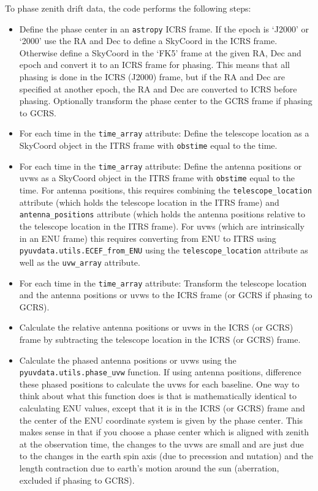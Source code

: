 \documentclass[11pt, oneside]{article}   	%
\begin{document}
To phase zenith drift data, the code performs the following steps:
\begin{itemize}
\item{Define the phase center in an \texttt{astropy} ICRS frame. If the epoch is `J2000' or `2000' use the RA and Dec to define a SkyCoord in the ICRS frame. Otherwise define a SkyCoord in the `FK5' frame at the given RA, Dec and epoch and convert it to an ICRS frame for phasing. This means that all phasing is done in the ICRS (J2000) frame, but if the RA and Dec are specified at another epoch, the RA and Dec are converted to ICRS before phasing. Optionally transform the phase center to the GCRS frame if phasing to GCRS.}
\item{For each time in the \verb!time_array! attribute: Define the telescope location as a SkyCoord object in the ITRS frame with \verb!obstime! equal to the time.}
\item{For each time in the \verb!time_array! attribute: Define the antenna positions or uvws as a SkyCoord object in the ITRS frame with \verb!obstime! equal to the time. For antenna positions, this requires combining the \verb!telescope_location! attribute (which holds the telescope location in the ITRS frame) and \verb!antenna_positions! attribute (which holds the antenna positions relative to the telescope location in the ITRS frame). For uvws (which are intrinsically in an ENU frame) this requires converting from ENU to ITRS using \verb! pyuvdata.utils.ECEF_from_ENU! using the \verb!telescope_location! attribute as well as the \verb!uvw_array! attribute.}
\item{For each time in the \verb!time_array! attribute: Transform the telescope location and the antenna positions or uvws to the ICRS frame (or GCRS if phasing to GCRS).}
\item{Calculate the relative antenna positions or uvws in the ICRS (or GCRS) frame by subtracting the telescope location in the ICRS (or GCRS) frame.}
\item{Calculate the phased antenna positions or uvws using the \verb!pyuvdata.utils.phase_uvw! function. If using antenna positions, difference these phased positions to calculate the uvws for each baseline. One way to think about what this function does is that is mathematically identical to calculating ENU values, except that it is in the ICRS (or GCRS) frame and the center of the ENU coordinate system is given by the phase center. This makes sense in that if you choose a phase center which is aligned with zenith at the observation time, the changes to the uvws are small and are just due to the changes in the earth spin axis (due to precession and nutation) and the length contraction due to earth's motion around the sun (aberration, excluded if phasing to GCRS).}
\end{itemize}
\end{document}
